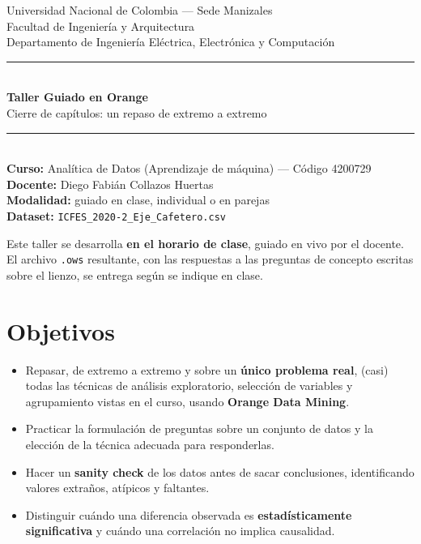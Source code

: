 \documentclass[11pt,letterpaper]{article}
\title{\vspace{-2cm}}
\date{}
\begin{document}
\begin{titlepage}
\centering
\vspace*{1.5cm}

{\Large Universidad Nacional de Colombia --- Sede Manizales}\\[0.2cm]
{\large Facultad de Ingeniería y Arquitectura}\\[0.2cm]
{\large Departamento de Ingeniería Eléctrica, Electrónica y Computación}\\[1.2cm]

\rule{\linewidth}{1pt}\\[0.5cm]
{\huge\bfseries\color{brandblue} Taller Guiado en Orange}\\[0.4cm]
{\Large Cierre de capítulos: un repaso de extremo a extremo}\\[0.5cm]
\rule{\linewidth}{1pt}\\[1cm]

{\large \textbf{Curso:} Analítica de Datos (Aprendizaje de máquina) --- Código 4200729}\\[0.3cm]
{\large \textbf{Docente:} Diego Fabián Collazos Huertas}\\[0.3cm]
{\large \textbf{Modalidad:} guiado en clase, individual o en parejas}\\[0.3cm]
{\large \textbf{Dataset:} \texttt{ICFES\_2020-2\_Eje\_Cafetero.csv}}\\[1.5cm]

\vfill

{\small Este taller se desarrolla \textbf{en el horario de clase}, guiado en vivo por el docente. El archivo \texttt{.ows} resultante, con las respuestas a las preguntas de concepto escritas sobre el lienzo, se entrega según se indique en clase.}

\end{titlepage}

\section{Objetivos}

\begin{itemize}[leftmargin=1.2cm]
  \item Repasar, de extremo a extremo y sobre un \textbf{único problema real}, (casi) todas las técnicas de análisis exploratorio, selección de variables y agrupamiento vistas en el curso, usando \textbf{Orange Data Mining}.
  \item Practicar la formulación de preguntas sobre un conjunto de datos y la elección de la técnica adecuada para responderlas.
  \item Hacer un \textbf{sanity check} de los datos antes de sacar conclusiones, identificando valores extraños, atípicos y faltantes.
  \item Distinguir cuándo una diferencia observada es \textbf{estadísticamente significativa} y cuándo una correlación no implica causalidad.
\end{itemize}
\end{document}
